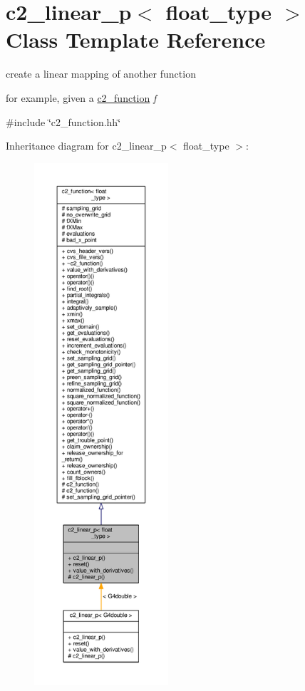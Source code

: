 \hypertarget{classc2__linear__p}{}\section{c2\+\_\+linear\+\_\+p$<$ float\+\_\+type $>$ Class Template Reference}
\label{classc2__linear__p}


create a linear mapping of another function

for example, given a \hyperlink{classc2__function}{c2\+\_\+function} {\itshape f}  




{\ttfamily \#include \char`\"{}c2\+\_\+function.\+hh\char`\"{}}



Inheritance diagram for c2\+\_\+linear\+\_\+p$<$ float\+\_\+type $>$\+:
\nopagebreak
\begin{figure}[H]
\begin{center}
\leavevmode
\includegraphics[height=550pt]{classc2__linear__p__inherit__graph}
\end{center}
\end{figure}



